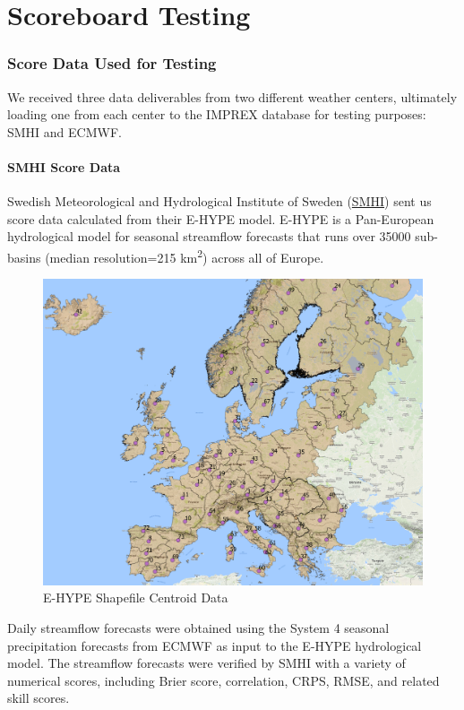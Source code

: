 \documentclass[logos,parttoc,morelanguage=french,morelanguage=german]{orsay-memoire}
\begin{document}
\part{Scoreboard Testing}

\section{Score Data Used for Testing}

We received three data deliverables from two different weather centers, ultimately loading one from each center to the IMPREX database for testing purposes: SMHI and ECMWF.

\subsection{SMHI Score Data}

Swedish Meteorological and Hydrological Institute of Sweden (\href{http://www.smhi.se/en}{SMHI}) sent us score data calculated from their E-HYPE model. E-HYPE is a Pan-European hydrological model for seasonal streamflow forecasts that runs over 35000 sub-basins (median resolution=215 km\textsuperscript{2}) across all of Europe.

\begin{figure}[H]
\centering
\includegraphics[width=0.8\linewidth]{images/gisEHYPEcentroids.png}
  \caption{E-HYPE Shapefile Centroid Data}
  \label{fig:EHYPEdata}
\end{figure}

Daily streamflow forecasts were obtained using the System 4 seasonal precipitation forecasts from ECMWF as input to the E-HYPE hydrological model. The streamflow forecasts were verified by SMHI with a variety of numerical scores, including Brier score, correlation, CRPS, RMSE, and related skill scores.
\end{document}
